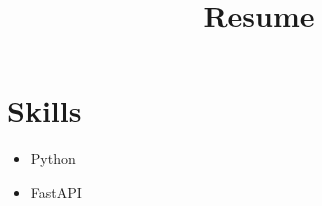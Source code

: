 \documentclass{article}%
\title{Resume}%
\date{}%
\begin{document}
%
\normalsize%
\maketitle%
\section{Skills}
\begin{itemize}
\item Python
\item FastAPI
\end{itemize}%
\end{document}
